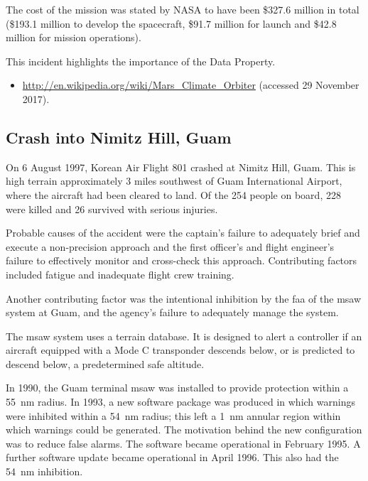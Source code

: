 The cost of the mission was stated by NASA to have been \$327.6 million in total (\$193.1 million to develop the spacecraft, \$91.7 million for launch and \$42.8 million for mission operations). 

This incident highlights the importance of the  Data Property.

\begin{itemize}
  \item \raggedright{\href{http://en.wikipedia.org/wiki/Mars_Climate_Orbiter}{http://en.wikipedia.org/wiki/Mars\_Climate\_Orbiter} (accessed 29 November 2017).}
\end{itemize}


\subsection{Crash into Nimitz Hill, Guam} \label{bkm:incacc:nimitzhill}
On 6 August 1997, Korean Air Flight 801 crashed at Nimitz Hill, Guam. This is high terrain approximately 3 miles southwest of Guam International Airport, where the aircraft had been cleared to land. Of the 254 people on board, 228 were killed and 26 survived with serious injuries.

Probable causes of the accident were the captain's failure to adequately brief and execute a non-precision approach and the first officer's and flight engineer's failure to effectively monitor and cross-check this approach. Contributing factors included fatigue and inadequate flight crew training.

Another contributing factor was the intentional inhibition by the \gls{faa} of the \gls{msaw} system at Guam, and the agency's failure to adequately manage the system.

The \gls{msaw} system uses a terrain \gls{database}. It is designed to alert a controller if an aircraft equipped with a Mode C transponder descends below, or is predicted to descend below, a predetermined safe altitude.

In 1990, the Guam terminal \gls{msaw} was installed to provide protection within a 55~nm radius. In 1993, a new software package was produced in which warnings were inhibited within a 54~nm radius; this left a 1~nm annular region within which warnings could be generated. The motivation behind the new configuration was to reduce false alarms. The software became operational in February 1995. A further software update became operational in April 1996. This also had the 54~nm inhibition.

